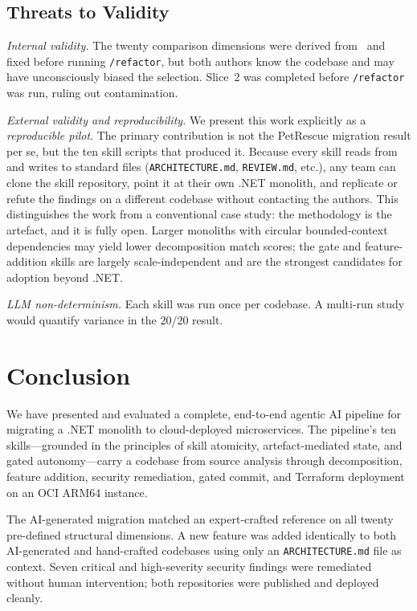 \documentclass[10pt,journal,compsoc]{IEEEtran}
\begin{document}
\subsection{Threats to Validity}
\textit{Internal validity.}  The twenty comparison dimensions were
derived from~\cite{taibi2017processes} and fixed before running
\texttt{/refactor}, but both authors know the codebase and may have
unconsciously biased the selection.  Slice~2 was completed before
\texttt{/refactor} was run, ruling out contamination.

\textit{External validity and reproducibility.}
We present this work explicitly as a \emph{reproducible pilot}.
The primary contribution is not the PetRescue migration result per se,
but the ten skill scripts that produced it.  Because every skill reads
from and writes to standard files (\texttt{ARCHITECTURE.md},
\texttt{REVIEW.md}, etc.), any team can clone the skill repository,
point it at their own .NET monolith, and replicate or refute the
findings on a different codebase without contacting the authors.
This distinguishes the work from a conventional case study: the
methodology is the artefact, and it is fully open.
Larger monoliths with circular bounded-context dependencies may yield
lower decomposition match scores; the gate and feature-addition skills
are largely scale-independent and are the strongest candidates for
adoption beyond .NET.

\textit{LLM non-determinism.}  Each skill was run once per codebase.
A multi-run study would quantify variance in the 20/20 result.

\section{Conclusion}
\label{sec:conclusion}

We have presented and evaluated a complete, end-to-end agentic AI
pipeline for migrating a .NET monolith to cloud-deployed microservices.
The pipeline's ten skills—grounded in the principles of skill
atomicity, artefact-mediated state, and gated autonomy—carry a
codebase from source analysis through decomposition, feature addition,
security remediation, gated commit, and Terraform deployment on an
OCI ARM64 instance.

The AI-generated migration matched an expert-crafted reference on all
twenty pre-defined structural dimensions.  A new feature was added
identically to both AI-generated and hand-crafted codebases using only
an \texttt{ARCHITECTURE.md} file as context.  Seven critical and
high-severity security findings were remediated without human
intervention; both repositories were published and deployed cleanly.
\end{document}
